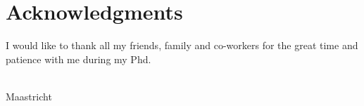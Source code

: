 \chapter{Acknowledgments}
I would like to thank all my friends, family and co-workers for the great time and patience with me during my Phd.

{\flushright \thesisauthor \\ Maastricht \\ \thesisdate \\ }